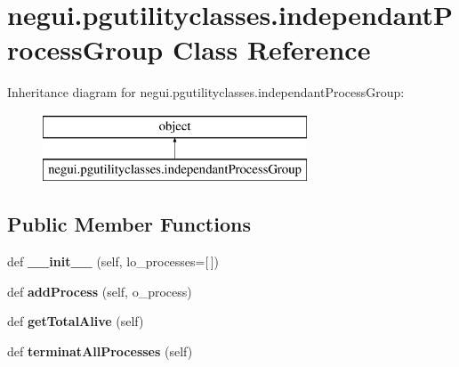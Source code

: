 \hypertarget{classnegui_1_1pgutilityclasses_1_1independantProcessGroup}{}\section{negui.\+pgutilityclasses.\+independant\+Process\+Group Class Reference}
\label{classnegui_1_1pgutilityclasses_1_1independantProcessGroup}
Inheritance diagram for negui.\+pgutilityclasses.\+independant\+Process\+Group\+:\begin{figure}[H]
\begin{center}
\leavevmode
\includegraphics[height=2.000000cm]{classnegui_1_1pgutilityclasses_1_1independantProcessGroup}
\end{center}
\end{figure}
\subsection*{Public Member Functions}
\begin{DoxyCompactItemize}
\item 
def {\bfseries \+\_\+\+\_\+init\+\_\+\+\_\+} (self, lo\+\_\+processes=\mbox{[}$\,$\mbox{]})\hypertarget{classnegui_1_1pgutilityclasses_1_1independantProcessGroup_ac4c5c5b9bc52d8656cfb11ad6c3e83aa}{}\label{classnegui_1_1pgutilityclasses_1_1independantProcessGroup_ac4c5c5b9bc52d8656cfb11ad6c3e83aa}

\item 
def {\bfseries add\+Process} (self, o\+\_\+process)\hypertarget{classnegui_1_1pgutilityclasses_1_1independantProcessGroup_a746744058b90f36519d457f5fe9ff1fc}{}\label{classnegui_1_1pgutilityclasses_1_1independantProcessGroup_a746744058b90f36519d457f5fe9ff1fc}

\item 
def {\bfseries get\+Total\+Alive} (self)\hypertarget{classnegui_1_1pgutilityclasses_1_1independantProcessGroup_aa71d2b1111036aebcd9feb658797b819}{}\label{classnegui_1_1pgutilityclasses_1_1independantProcessGroup_aa71d2b1111036aebcd9feb658797b819}

\item 
def {\bfseries terminat\+All\+Processes} (self)\hypertarget{classnegui_1_1pgutilityclasses_1_1independantProcessGroup_a87e3c1396c5f4605f1ba7b46bde9acab}{}\label{classnegui_1_1pgutilityclasses_1_1independantProcessGroup_a87e3c1396c5f4605f1ba7b46bde9acab}

\end{DoxyCompactItemize}


